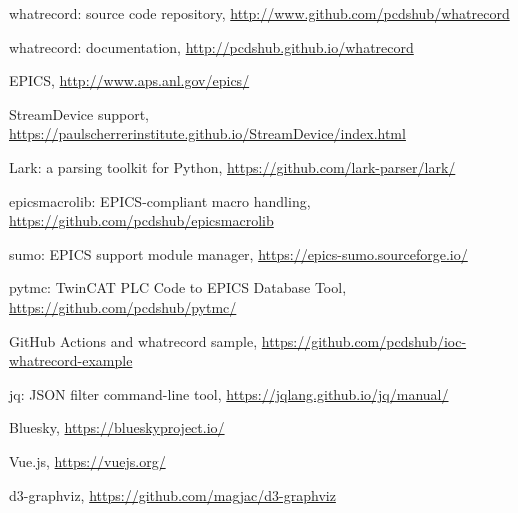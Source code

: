 \documentclass[letter,
               keeplastbox,   %
               ]{jacow}
\begin{document}
%
	{\printbibliography}%
	{%
	
	\begin{thebibliography}{9} %
	
    whatrecord: source code repository,
		\url{http://www.github.com/pcdshub/whatrecord}
	
    whatrecord: documentation,
		\url{http://pcdshub.github.io/whatrecord}
	
		EPICS,
		\url{http://www.aps.anl.gov/epics/}
	
		StreamDevice support,
		\url{https://paulscherrerinstitute.github.io/StreamDevice/index.html}
	
		Lark: a parsing toolkit for Python,
		\url{https://github.com/lark-parser/lark/}
	
    epicsmacrolib: EPICS-compliant macro handling,
		\url{https://github.com/pcdshub/epicsmacrolib}
	
		sumo: EPICS support module manager,
		\url{https://epics-sumo.sourceforge.io/}
	
    pytmc: TwinCAT PLC Code to EPICS Database Tool,
		\url{https://github.com/pcdshub/pytmc/}
	
		GitHub Actions and whatrecord sample,
		\url{https://github.com/pcdshub/ioc-whatrecord-example}
	
		jq: JSON filter command-line tool,
		\url{https://jqlang.github.io/jq/manual/}
	
    Bluesky,
		\url{https://blueskyproject.io/}
	
    Vue.js,
		\url{https://vuejs.org/}
	
    d3-graphviz,
		\url{https://github.com/magjac/d3-graphviz}
	
	\end{thebibliography}
} %

%
% 

\end{document}
